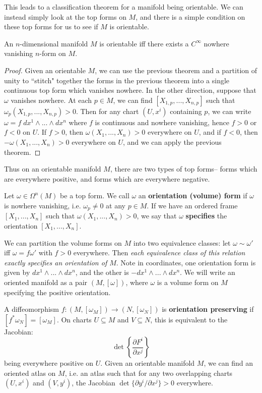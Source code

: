 This leads to a classification theorem for a manifold being orientable. We can instead simply look at the top forms on $M$, 
and there is a simple condition on these top forms for us to see if $M$ is orientable.
\begin{theorem}
	An $n$-dimensional manifold $M$ is orientable iff there exists a $C^\infty$ nowhere vanishing $n$-form on $M$. 
\end{theorem}
\begin{proof}
Given an orientable $M$, we can use the previous theorem and a partition of unity to ``stitch" together 
the forms in the previous theorem into a single continuous top form which vanishes nowhere. In the other direction, 
suppose that $\omega$ vanishes nowhere. At each $p\in M$, we can find $[X_{1, p}, ..., X_{n, p}]$ such that $\omega_p
(X_{1, p}, ..., X_{n, p}) > 0$. Then for any chart $(U, x^i)$ containing $p$, we can write $\omega = f\;dx^1\wedge ...\wedge 
dx^n$ where $f$ is continuous and nowhere vanishing, hence $f > 0$ or $f < 0$ on $U$. If $f > 0$, then $\omega(X_1, ..., 
X_n) > 0$ everywhere on $U$, and if $f < 0$, then $-\omega(X_1, ..., X_n) > 0$ everywhere on $U$, and we can 
apply the previous theorem.
\end{proof}
Thus on an orientable manifold $M$, there are two types of top forms-- forms which are everywhere positive, and forms which 
are everywhere negative. 
\begin{definition}
	Let $\omega\in\Omega^n(M)$ be a top form. We call $\omega$ an \textbf{orientation (volume) form} if $\omega$ is 
	nowhere vanishing, i.e. $\omega_p\neq 0$ at any $p\in M$. If we have an ordered frame $[X_1, ..., X_n]$ such that 
	$\omega(X_1, ..., X_n) > 0$, we say that $\omega$ \textbf{specifies} the orientation $[X_1, ..., X_n]$. 
\end{definition}
We can partition the volume forms on $M$ into two equivalence classes: let $\omega\sim\omega'$ iff $\omega = f\omega'$ 
with $f > 0$ everywhere. Then \textit{each equivalence class of this relation exactly specifies an orientation of $M$}. 
Note in coordinates, one orientation form is given by $dx^1\wedge ...\wedge dx^n$, and the other is $-dx^1\wedge ...
\wedge dx^n$. We will write an oriented manifold as a pair $(M, [\omega])$, where $\omega$ is a volume form on $M$ 
specifying the positive orientation. 

A diffeomorphism $f : (M, [\omega_M])\rightarrow (N, [\omega_N])$ is \textbf{orientation preserving} if $[f^*\omega_N] = 
[\omega_M]$. On charts $U\subseteq M$ and $V\subseteq N$, this is equivalent to the Jacobian:
\begin{equation}
	\det\left\{\frac{\partial F^i}{\partial x^j}\right\}
\end{equation}
being everywhere positive on $U$. Given an orientable manifold $M$, we can find an oriented atlas on $M$, i.e. an atlas 
such that for any two overlapping charts $(U, x^i)$ and $(V, y^i)$, the Jacobian $\det\{\partial y^i / \partial x^j\} > 0$ 
everywhere. 


